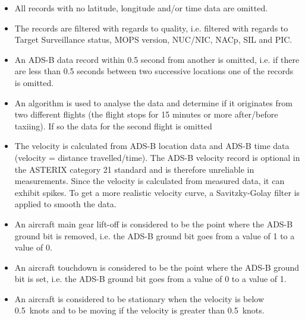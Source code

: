 \begin{itemize}
    \item All records with no latitude, longitude and/or time data are omitted.
    \item The records are filtered with regards to quality, i.e. filtered with regards to Target Surveillance status, MOPS version, NUC/NIC, NACp, SIL and PIC.
    \item An ADS-B data record within 0.5 second from another is omitted, i.e. if there are less than 0.5 seconds between two successive locations one of the records is omitted.
    \item An algorithm is used to analyse the data and determine if it originates from two different flights (the flight stops for 15 minutes or more after/before taxiing). If so the data for the second flight is omitted
    \item The velocity is calculated from ADS-B location data and ADS-B time data (velocity = distance travelled/time). The ADS-B velocity record is optional in the ASTERIX category 21 standard and is therefore unreliable in measurements. Since the velocity is calculated from measured data, it can exhibit spikes. To get a more realistic velocity curve, a Savitzky-Golay filter is applied to smooth the data.
    \item An aircraft main gear lift-off is considered to be the point where the ADS-B ground bit is removed, i.e. the ADS-B ground bit goes from a value of 1 to a value of 0.
    \item An aircraft touchdown is considered to be the point where the ADS-B ground bit is set, i.e. the ADS-B ground bit goes from a value of 0 to a value of 1.
    \item An aircraft is considered to be stationary when the velocity is below 0.5~knots and to be moving if the velocity is greater than 0.5~knots.
    \cite{isavia_wiki}
\end{itemize}



